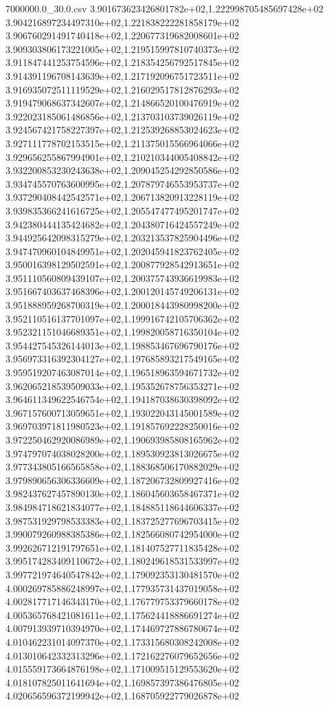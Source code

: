 \begin{filecontents*}{7000000.0_30.0.csv}
3.901673623426801782e+02,1.222998705485697428e+02
3.904216897234497310e+02,1.221838222281858179e+02
3.906760291491740418e+02,1.220677319682008601e+02
3.909303806173221005e+02,1.219515997810740373e+02
3.911847441253754596e+02,1.218354256792517845e+02
3.914391196708143639e+02,1.217192096751723511e+02
3.916935072511119529e+02,1.216029517812876293e+02
3.919479068637342607e+02,1.214866520100476919e+02
3.922023185061486856e+02,1.213703103739026119e+02
3.924567421758227397e+02,1.212539268853024623e+02
3.927111778702153515e+02,1.211375015566964066e+02
3.929656255867994901e+02,1.210210344005408842e+02
3.932200853230243638e+02,1.209045254292850586e+02
3.934745570763600995e+02,1.207879746553953737e+02
3.937290408442542571e+02,1.206713820913228119e+02
3.939835366241616725e+02,1.205547477495201747e+02
3.942380444135424682e+02,1.204380716424557249e+02
3.944925642098315279e+02,1.203213537825904496e+02
3.947470960104849951e+02,1.202045941823762405e+02
3.950016398129502591e+02,1.200877928542913651e+02
3.951110560809439107e+02,1.200375743936619983e+02
3.951667403637468396e+02,1.200120145749206131e+02
3.951888959268700319e+02,1.200018443980998200e+02
3.952110516137701097e+02,1.199916742105706362e+02
3.952321151046689351e+02,1.199820058716350104e+02
3.954427545326144013e+02,1.198853467696790176e+02
3.956973316392304127e+02,1.197685893217549165e+02
3.959519207463087014e+02,1.196518963594671732e+02
3.962065218539509033e+02,1.195352678756353271e+02
3.964611349622546754e+02,1.194187038630398092e+02
3.967157600713059651e+02,1.193022043145001589e+02
3.969703971811980523e+02,1.191857692228250016e+02
3.972250462920086989e+02,1.190693985808165962e+02
3.974797074038028200e+02,1.189530923813026675e+02
3.977343805166565858e+02,1.188368506170882029e+02
3.979890656306336609e+02,1.187206732809927416e+02
3.982437627457890130e+02,1.186045603658467371e+02
3.984984718621834077e+02,1.184885118644606337e+02
3.987531929798533383e+02,1.183725277696703415e+02
3.990079260988385386e+02,1.182566080742954000e+02
3.992626712191797651e+02,1.181407527711835428e+02
3.995174283409110672e+02,1.180249618531533997e+02
3.997721974640547842e+02,1.179092353130481570e+02
4.000269785886248997e+02,1.177935731437019058e+02
4.002817717146343170e+02,1.176779753379660178e+02
4.005365768421081611e+02,1.175624418886691274e+02
4.007913939710394970e+02,1.174469727886780674e+02
4.010462231014097370e+02,1.173315680308242008e+02
4.013010642332313296e+02,1.172162276079652656e+02
4.015559173664876198e+02,1.171009515129553620e+02
4.018107825011641694e+02,1.169857397386476805e+02
4.020656596372199942e+02,1.168705922779026878e+02

\end{filecontents*}
